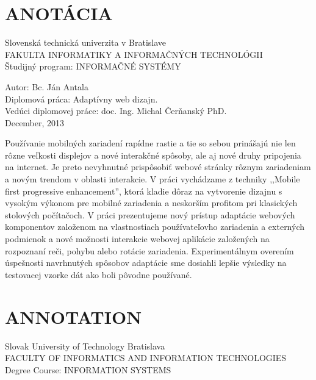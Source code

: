 
\newpage


%



\section*{ANOTÁCIA}
\thispagestyle{empty}
Slovenská technická univerzita v Bratislave\\
FAKULTA INFORMATIKY A INFORMAČNÝCH TECHNOLÓGII\\
Študijný program: INFORMAČNÉ SYSTÉMY
\newline

Autor: Bc. Ján Antala\\
Diplomová práca: Adaptívny web dizajn.\\ 
Vedúci diplomovej práce: doc. Ing. Michal Čerňanský PhD. \\
December, 2013
\newline

Používanie mobilných zariadení rapídne rastie a tie so sebou prinášajú nie len rôzne veľkosti displejov a nové interakčné spôsoby, ale aj nové druhy pripojenia na internet. Je preto nevyhnutné prispôsobiť webové stránky rôznym zariadeniam a novým trendom v oblasti interakcie.
V práci vychádzame z techniky ,,Mobile first progressive enhancement'', ktorá kladie dôraz na vytvorenie dizajnu s vysokým výkonom pre mobilné zariadenia a neskorším profitom pri klasických stolových počítačoch. V práci prezentujeme nový prístup adaptácie webových komponentov založenom na vlastnostiach používateľovho zariadenia a externých podmienok a nové možnosti interakcie webovej aplikácie založených na rozpoznaní reči, pohybu alebo rotácie zariadenia.
Experimentálnym overením úspešnosti navrhnutých spôsobov adaptácie sme dosiahli lepšie výsledky na testovacej vzorke dát ako boli pôvodne používané.

\newpage

\section*{ANNOTATION}
\thispagestyle{empty}
Slovak University of Technology Bratislava\\
FACULTY OF INFORMATICS AND INFORMATION TECHNOLOGIES\\
Degree Course: INFORMATION SYSTEMS
\newline

